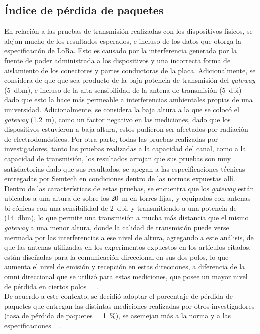 \begin{justify}
\subsection{Índice de pérdida de paquetes}
En relación a las pruebas de transmisión realizadas con los dispositivos físicos, se alejan mucho de los resultados esperados, e incluso de los datos que otorga la especificación de LoRa. Esto es causado por la interferencia generada por la fuente de poder administrada a los dispositivos y una incorrecta forma de aislamiento de los conectores y partes conductoras de la placa. Adicionalmente, se considera de que que sea producto de la baja potencia de transmisión del \textit{gateway} (\SI{5}{dbm}), e incluso de la alta sensibilidad de la antena de transmisión (\SI{5}{dbi}) dado que esto la hace más permeable a interferencias ambientales propias de una universidad. Adicionalmente, se considera la baja altura a la que se colocó el \textit{gateway} (\SI{1.2}{\meter}), como un factor negativo en las mediciones, dado que los dispositivos estuvieron a baja altura, estos pudieron ser afectados por radiación de electrodomésticos. Por otra parte, todas las pruebas realizadas por investigadores, tanto las pruebas realizadas a la capacidad del canal, como a la capacidad de transmisión, los resultados arrojan que sus pruebas son muy satisfactorias dado que sus resultados, se apegan a las especificaciones técnicas entregadas por Semtech en condiciones dentro de las normas expuestas allí.\newpage \noindent 
Dentro de las características de estas pruebas, se encuentra que los \textit{gateway} están ubicados a una altura de sobre los \SI{20}{\meter} en torres fijas, y equipados con antenas bi-cónicas con una sensibilidad de \SI{2}{dbi}, y transmitiendo a una potencia de (\SI{14}{dbm}), lo que permite una transmisión a mucha más distancia que el mismo \textit{gateway} a una menor altura, donde la calidad de transmisión puede verse mermada por las interferencias a ese nivel de altura, agregando a este análisis, de que las antenas utilizadas en los experimentos expuestos en los artículos citados, están diseñadas para la comunicación direccional en sus dos polos, lo que aumenta el nivel de emisión y recepción en estas direcciones, a diferencia de la omni direccional que se utilizó para estas mediciones, que posee un mayor nivel de pérdida en ciertos polos~\cite{Xavier}~\cite{Juha}~\cite{NORMAN}.\\
De acuerdo a este contexto, se decidió adoptar el porcentaje de pérdida de paquetes que entregan las distintas mediciones realizadas por otros investigadores (tasa de pérdida de paquetes = \SI{1}{\percent}), se asemejan más a la norma y a las especificaciones~\cite{Xavier}~\cite{Juha}.


\end{justify}
